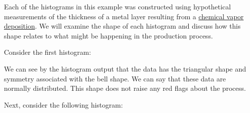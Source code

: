 \documentclass{ximera}
\begin{document}
\begin{example}\label{ex:histogram1}


Each of the histograms in this example was constructed using hypothetical measurements of the thickness of a metal layer resulting from a \href{https://en.wikipedia.org/wiki/Chemical_vapor_deposition}{chemical vapor deposition}.  We will examine the shape of each histogram and discuss how this shape relates to what might be happening in the production process.

Consider the first histogram:

\begin{center}
      \end{center}

We can see by the histogram output that the data has the triangular shape and symmetry associated with the bell shape. We can say that these data are normally distributed.  This shape does not raise any red flags about the process.

Next, consider the following histogram:


\end{example}
\end{document}
